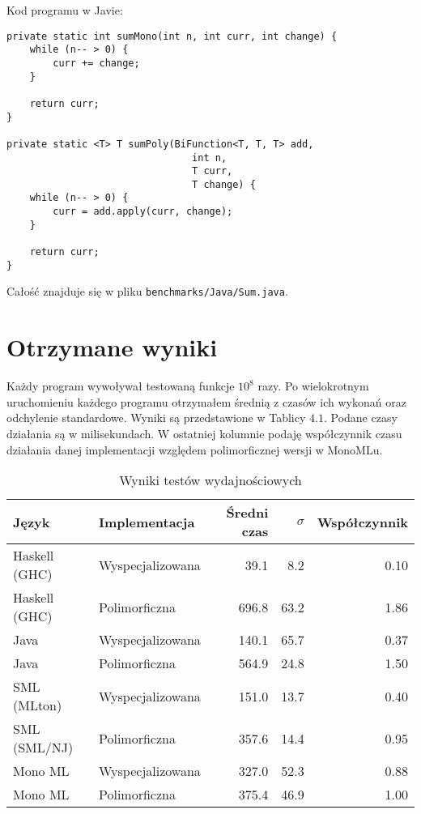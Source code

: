 \documentclass[declaration,shortabstract]{iithesis}
\begin{document}
Kod programu w Javie: 
\begin{lstlisting}[frame=lines]
private static int sumMono(int n, int curr, int change) {
    while (n-- > 0) {
        curr += change;
    }

    return curr;
}

private static <T> T sumPoly(BiFunction<T, T, T> add, 
                                int n, 
                                T curr, 
                                T change) {
    while (n-- > 0) {
        curr = add.apply(curr, change);
    }

    return curr;
}
\end{lstlisting}
Całość znajduje się w pliku \texttt{benchmarks/Java/Sum.java}.



\section{Otrzymane wyniki}

Każdy program wywoływał testowaną funkcje $10^8$ razy.
Po wielokrotnym uruchomieniu każdego programu otrzymałem średnią z czasów ich 
wykonań oraz odchylenie standardowe. Wyniki są przedstawione w Tablicy $4.1$.
Podane czasy działania są w milisekundach.
W ostatniej kolumnie podaję współczynnik czasu działania danej implementacji 
względem polimorficznej wersji w MonoMLu.
\pagebreak

\begin{center}
\begin{table}
\caption{Wyniki testów wydajnościowych}
\begin{tabular}{|| l | l | r | r | r ||} 

 \hline
 Język & Implementacja & Średni czas & $\sigma$ & Współczynnik \\ 
 \hline\hline
 Haskell (GHC)        & Wyspecjalizowana & 39.1  & 8.2  & 0.10 \\ 
 Haskell (GHC)        & Polimorficzna    & 696.8 & 63.2 & 1.86 \\ 
 Java                 & Wyspecjalizowana & 140.1 & 65.7 & 0.37 \\ 
 Java                 & Polimorficzna    & 564.9 & 24.8 & 1.50 \\ 
 SML (MLton)  & Wyspecjalizowana & 151.0 & 13.7 & 0.40 \\ 
 SML (SML/NJ) & Polimorficzna    & 357.6 & 14.4 & 0.95 \\ 
 Mono ML              & Wyspecjalizowana & 327.0 & 52.3 & 0.88 \\ 
 Mono ML              & Polimorficzna    & 375.4 & 46.9 & 1.00 \\ 
 \hline
\end{tabular}
\end{table}
\end{center}
\end{document}
